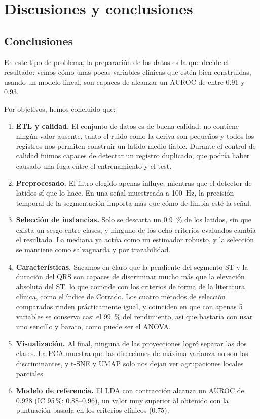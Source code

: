 \clearpage
\section{Discusiones y conclusiones}\label{cap:conclusiones}

\subsection{Conclusiones}

En este tipo de problema, la preparación de los datos es la que decide el resultado: vemos cómo unas pocas variables clínicas que estén bien construidas, usando un modelo lineal, son capaces de alcanzar un AUROC de entre \num{0.91} y \num{0.93}.

Por objetivos, hemos concluido que:

\begin{enumerate}[label=\textbf{O\arabic*}, leftmargin=2.4em]
  \item \textbf{ETL y calidad.} El conjunto de datos es de buena calidad: no contiene ningún valor ausente, tanto el ruido como la deriva son pequeños y todos los registros nos permiten construir un latido medio fiable. Durante el control de calidad fuimos capaces de detectar un registro duplicado, que podría haber causado una fuga entre el entrenamiento y el test.
  \item \textbf{Preprocesado.} El filtro elegido apenas influye, mientras que el detector de latidos sí que lo hace. En una señal muestreada a \SI{100}{\hertz}, la precisión temporal de la segmentación importa más que cómo de limpia esté la señal.
  \item \textbf{Selección de instancias.} Solo se descarta un \SI{0.9}{\percent} de los latidos, sin que exista un sesgo entre clases, y ninguno de los ocho criterios evaluados cambia el resultado. La mediana ya actúa como un estimador robusto, y la selección se mantiene como salvaguarda y por trazabilidad.
  \item \textbf{Características.} Sacamos en claro que la pendiente del segmento ST y la duración del QRS son capaces de discriminar mucho más que la elevación absoluta del ST, lo que coincide con los criterios de forma de la literatura clínica, como el índice de Corrado. Los cuatro métodos de selección comparados rinden prácticamente igual, y coinciden en que con apenas 5 variables se conserva casi el \SI{99}{\percent} del rendimiento, así que bastaría con usar uno sencillo y barato, como puede ser el ANOVA.
  \item \textbf{Visualización.} Al final, ninguna de las proyecciones logró separar las dos clases. La PCA muestra que las direcciones de máxima varianza no son las discriminantes, y t-SNE y UMAP solo nos dejan ver agrupaciones locales parciales.
  \item \textbf{Modelo de referencia.} El LDA con contracción alcanza un AUROC de \num{0.928} (IC 95\,\%: \numrange{0.88}{0.96}), un valor muy superior al obtenido con la puntuación basada en los criterios clínicos (\num{0.75}).
\end{enumerate}

